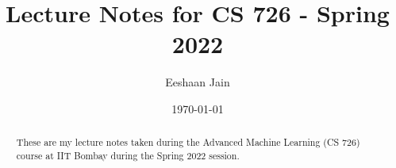 \documentclass[notoc,numbers]{tufte-handout}
\title{Lecture Notes for CS 726 - Spring 2022}
\author[Eeshaan Jain]{Eeshaan Jain}
\date{\today}  %
\theoremstyle{definition}
\theoremstyle{remark}
\begin{document}
	
	\maketitle
	\begin{abstract}
		These are my lecture notes taken during the Advanced Machine Learning (CS 726) course at IIT Bombay during the Spring 2022 session.	\end{abstract}
	\tableofcontents
	\vspace{5mm}
	\listofalgorithms
	\newpage
	
	
	
	
	
	
\end{document}
